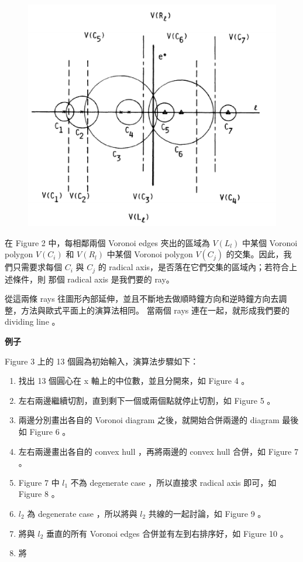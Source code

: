 \documentclass[12pt]{article}
\begin{document}
\begin{CJK}{UTF8}{bkai}
\begin{figure}[h]
\includegraphics[scale=0.5]{figure5(iv).eps}
\caption{}
\label{}
\end{figure}

在 Figure 2 中，每相鄰兩個 Voronoi edges 夾出的區域為 $V(L_l)$ 中某個 Voronoi polygon $V(C_i)$ 和 $V(R_l)$ 中某個 Voronoi polygon
 $V(C_j)$ 的交集。因此，我們只需要求每個 $C_i$ 與 $C_j$ 的 radical axis，是否落在它們交集的區域內；若符合上述條件，則
那個 radical axis 是我們要的 ray。


從這兩條 rays 往圖形內部延伸，並且不斷地去做順時鐘方向和逆時鐘方向去調整，方法與歐式平面上的演算法相同。
當兩個 rays 連在一起，就形成我們要的 dividing line 。\\



\centerline{\bf 例子}

Figure 3 上的 13 個圓為初始輸入，演算法步驟如下：

\begin{enumerate}

\item 找出 13 個圓心在 x 軸上的中位數，並且分開來，如 Figure 4 。
\item 左右兩邊繼續切割，直到剩下一個或兩個點就停止切割，如 Figure 5 。
\item 兩邊分別畫出各自的 Voronoi diagram 之後，就開始合併兩邊的 diagram
最後如 Figure 6 。
\item 左右兩邊畫出各自的 convex hull ，再將兩邊的 convex hull 合併，如 Figure 7 。
\item Figure 7 中 $l_1$ 不為 degenerate case ，所以直接求 radical axis 即可，如
 Figure 8 。
\item $l_2$ 為 degenerate case ，所以將與 $l_2$ 共線的一起討論，如 Figure 9 。
\item 將與 $l_2$ 垂直的所有 Voronoi edges 合併並有左到右排序好，如 Figure 10 。
\item 將 


\end{enumerate}
\end{CJK}
\end{document}
